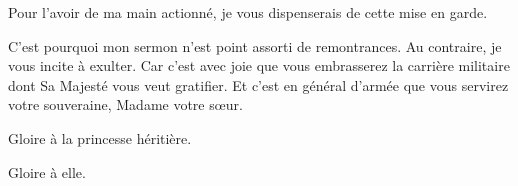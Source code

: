 \begin{drama}
  \elenaspeaks Pour l’avoir de ma main actionné, je vous dispenserais de cette mise en garde.

  \alexasspeaks C’est pourquoi mon sermon n’est point assorti de remontrances. Au contraire, je vous incite à exulter.
  Car c’est avec joie que vous embrasserez la carrière militaire dont Sa Majesté vous veut gratifier. Et c’est en général d’armée que vous servirez votre souveraine, Madame votre sœur.

  \elenaspeaks Gloire à la princesse héritière.

  \alexasspeaks Gloire à elle.

\end{drama}

\scene

\StageDirII{\elena, \alexas, \general{}}


